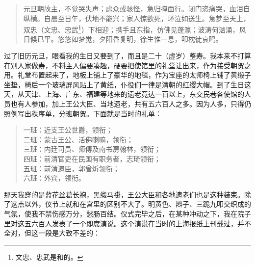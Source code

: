 \begin{quote}
	元旦朝故主，不觉哭失声；虑众或骇怪，急归掩面行。闭门恣痛哭，血泪自纵横。自晨至日午，伏地不能兴；家人惊欲死，环泣如送生。急梦至天上，双忠（文忠、忠武\footnote{文忠、忠武是和的。}）下相迎；携手且东指，仿佛见蓬瀛；波涛何汹涌，风日倏已平。悠悠如梦觉，夕阳昏复明，徐生惟一息，叩枕徒哀鸣。\\
\end{quote}

过了旧历元旦，眼看我的生日又要到了，而且是二十（虚岁）整寿。我本来不打算在别人家做寿，不料主人偏要凑趣，硬要把使馆里的礼堂让出来，作为接受朝贺之用。礼堂布置起来了，地板上铺上了豪华的地毯，作为宝座的太师椅上铺了黄缎子坐垫，椅后一个玻璃屏风贴上了黄纸，仆役们一律是清朝的红缨大帽。到了生日这天，从天津、上海、广东、福建等地来的遗老竟达一百以上，东交民巷各使馆的人员也有人参加，加上王公大臣、当地遗老，共有五六百人之多。因为人多，只得仍照例写出秩序单，分班朝贺。下面就是当时的礼单：\\

\begin{quote}
	一班：近支王公世爵，领衔；\\

二班：蒙古王公、活佛喇嘛，领衔；\\

三班：内廷司员、师傅及南书房翰林，领衔；\\

四班：前清官吏在民国有职务者，志琦领衔；\\

五班：前清遗臣，郭曾炘领衔；\\

六班：外宾，领衔。\\
\end{quote}

那天我穿的是蓝花丝葛长袍，黑缎马褂，王公大臣和各地遗老们也是这种装束。除了这点以外，仪节上就和在宫里的区别不大了。明黄色、辫子、三跪九叩交织成的气氛，使我不禁伤感万分，愁肠百结。仪式完毕之后，在某种冲动之下，我在院子里对这五六百人发表了一个即席演说。这个演说在当时的上海报纸上刊载过，并不全对，但这一段是大致不差的：\\

